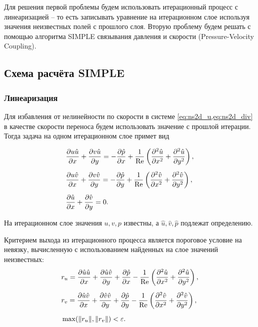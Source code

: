 Для решения первой проблемы будем использовать итерационный процесс с линеаризацией -- то есть
записывать уравнение на итерационном слое используя значения неизвестных полей с прошлого слоя.
Вторую проблему будем решать с помощью алгоритма SIMPLE
связывания давления и скорости (Pressure-Velocity Coupling).

\subsection{Схема расчёта SIMPLE}
\label{sec:simple_scheme}

\subsubsection{Линеаризация}
Для избавления от нелинейности по скорости в системе \cref{eq:ns2d_u,eq:ns2d_div} в качестве скорости переноса будем
использовать значение с прошлой итерации.
Тогда задача на одном итерационном слое примет вид

\begin{align}
    \label{eq:ns2d_semi_u}
    & \frac{\partial u \hat u}{\partial x} + \frac{\partial v \hat u}{\partial y} =
        -\frac{\partial \hat p}{\partial x}
        + \frac{1}{\mathrm{Re}}\left(\frac{\partial^2 \hat u}{\partial x^2} + \frac{\partial^2 \hat u}{\partial y^2}\right),\\[5pt]
    \label{eq:ns2d_semi_v}
    & \frac{\partial u\hat v}{\partial x} + \frac{\partial v \hat v}{\partial y} =
        -\frac{\partial \hat p}{\partial y}
        + \frac{1}{\mathrm{Re}}\left(\frac{\partial^2 \hat v}{\partial x^2} + \frac{\partial^2 \hat v}{\partial y^2}\right), \\[5pt]
    \label{eq:ns2d_semi_div}
    &\frac{\partial \hat u}{\partial x} + \frac{\partial \hat v}{\partial y} = 0.
\end{align}

На итерационном слое значения $u, v, p$
известны, а $\hat u, \hat v, \hat p$ подлежат определению.

Критерием выхода из итерационного процесса является пороговое условие на невязку,
вычисленную с использованием найденных на слое значений неизвестных:
\begin{align}
    \nonumber
    &r_u = \frac{\partial \hat u \hat u}{\partial x} + \frac{\partial \hat u \hat v}{\partial y}
        + \frac{\partial \hat p}{\partial x}
        - \frac{1}{\mathrm{Re}}\left(\frac{\partial^2 \hat u}{\partial x^2} + \frac{\partial^2 \hat u}{\partial y^2}\right),\\[5pt]
    \nonumber
    &r_v = \frac{\partial \hat u\hat v}{\partial x} + \frac{\partial \hat v \hat v}{\partial y}
        +\frac{\partial \hat p}{\partial y}
        - \frac{1}{\mathrm{Re}}\left(\frac{\partial^2 \hat v}{\partial x^2} + \frac{\partial^2 \hat v}{\partial y^2}\right), \\[5pt]
    \label{eq:ns2d_residual}
    &\max(\lVert r_u \rVert, \lVert r_v \rVert) < \varepsilon.
\end{align}


